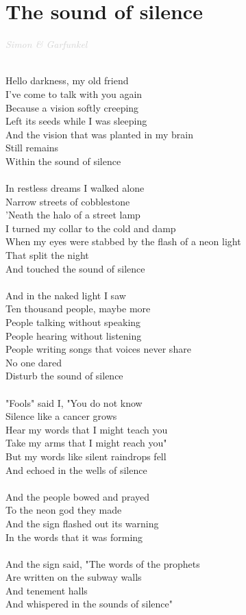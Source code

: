 \documentclass[a5paper, 10pt]{book}
\begin{document}
\newpage
\section{The sound of silence}\textcolor{lightgray}{\textit{Simon \& Garfunkel}}\\~\\
\begin{minipage}[t]{0.7\textwidth}
Hello darkness, my old friend\\
I've come to talk with you again\\
Because a vision softly creeping\\
Left its seeds while I was sleeping\\
And the vision that was planted in my brain\\
Still remains\\
Within the sound of silence\\
\\
In restless dreams I walked alone\\
Narrow streets of cobblestone\\
'Neath the halo of a street lamp\\
I turned my collar to the cold and damp\\
When my eyes were stabbed by the flash of a neon light\\
That split the night\\
And touched the sound of silence\\
\\
And in the naked light I saw\\
Ten thousand people, maybe more\\
People talking without speaking\\
People hearing without listening\\
People writing songs that voices never share\\
No one dared\\
Disturb the sound of silence\\
\\
"Fools" said I, "You do not know\\
Silence like a cancer grows\\
Hear my words that I might teach you\\
Take my arms that I might reach you"\\
But my words like silent raindrops fell\\
And echoed in the wells of silence\\
\\
And the people bowed and prayed\\
To the neon god they made\\
And the sign flashed out its warning\\
In the words that it was forming\\
\\
And the sign said, "The words of the prophets\\
Are written on the subway walls\\
And tenement halls\\
And whispered in the sounds of silence"\\
\end{minipage}
\end{document}
